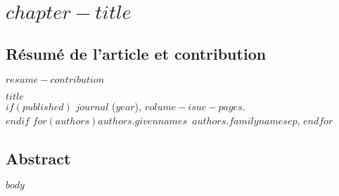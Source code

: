 \graphicspath{{chapter$chapter-number$/}{manuscript/}}

\chapter{\textbf{ $chapter-title$}}

\section{Résumé de l'article et contribution}

$resume-contribution$

\vfill{}
\pagebreak

\begin{center}
\textbf{$title$} \\
$if(published)$
\textit{$journal$} ($year$), $volume-isue-pages$. \\
$endif$
$for(authors)$$authors.givennames$~$authors.familyname$$sep$, $endfor$
\end{center}

\section{Abstract}


$body$

\newpage

\singlespacing
{\renewcommand{\bibname}{References}
\renewcommand{\bibsection}{\section{\bibname}}
}
